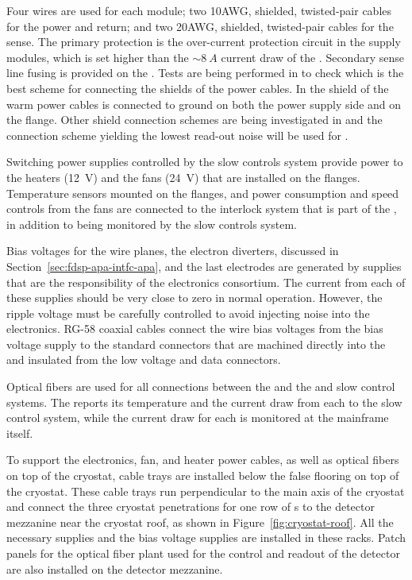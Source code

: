 Four wires are used for each  module; two \num{10}AWG, shielded, twisted-pair 
cables for the power and return; and two \num{20}AWG, shielded, twisted-pair 
cables for the sense. The primary protection is the over-current 
protection circuit in the  supply modules, which is set 
higher than the $\sim\SI{8}{A}$ current draw of the . 
Secondary sense line fusing is provided on the .  
Tests are being performed in  to check which is the
best scheme for connecting the shields of the power cables. In
 the shield of the warm power cables is connected to
ground on both the power supply side and on the  flange.
Other shield connection schemes are being investigated in 
and the connection scheme yielding the lowest read-out noise will be
used for .

Switching power supplies controlled by the slow controls system provide
power to the heaters (\SI{12}{V}) and the fans (\SI{24}{V}) that are 
installed on the  flanges. Temperature sensors mounted on the
flanges, and power consumption and speed controls from the fans are 
connected to the interlock system that is part of the , in
addition to being monitored by the slow controls system.

Bias voltages for the  wire planes, the electron diverters,
discussed in Section~\ref{sec:fdsp-apa-intfc-apa}, 
and the last  electrodes are generated by supplies that are 
the responsibility of the  electronics consortium.  The 
current from each of these supplies should be very close to zero in 
normal operation. However, the ripple voltage must be carefully 
controlled to avoid injecting noise into the  electronics.  
RG-58 coaxial cables connect the wire bias voltages from the bias voltage
supply to the standard  connectors that are machined directly 
into the  \fdth and insulated from the low voltage and 
data connectors.

Optical fibers are used for all connections between the  %
and the  and slow 
control systems.  The  reports its temperature 
and the current draw from each  to the slow control system, 
while the current draw for each  is monitored at the 
mainframe itself.

To support the electronics, fan, and heater power cables, as well 
as optical fibers on top of the cryostat, cable trays are installed
below the false flooring on top of the cryostat. These cable trays
run perpendicular to the main axis of the cryostat and connect the
three cryostat penetrations for one row of s to the detector
mezzanine near the cryostat roof, as shown in Figure~\ref{fig:cryostat-roof}.
All the necessary  supplies and %
the bias
voltage supplies are installed in these racks. Patch panels for
the optical fiber plant used for the control and readout of the
detector are also installed on the detector mezzanine.

